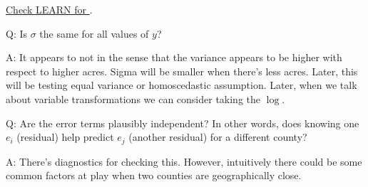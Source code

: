 \underline{Check LEARN for }.

Q\@: Is $ \sigma $ the same for all values of $ y $?

A\@: It appears to not in the sense that the variance
appears to be higher with respect to higher acres.
Sigma will be smaller when there's less acres.
Later, this will be testing equal variance or homoscedastic
assumption. Later, when we talk about variable
transformations we can consider taking the $ \log $.

Q\@: Are the error terms plausibly independent?
In other words,
does knowing one $ e_i $ (residual) help predict $ e_j $
(another residual) for a different county?

A\@: There's diagnostics for checking this. However,
intuitively there could be some common factors
at play when two counties are geographically close.

